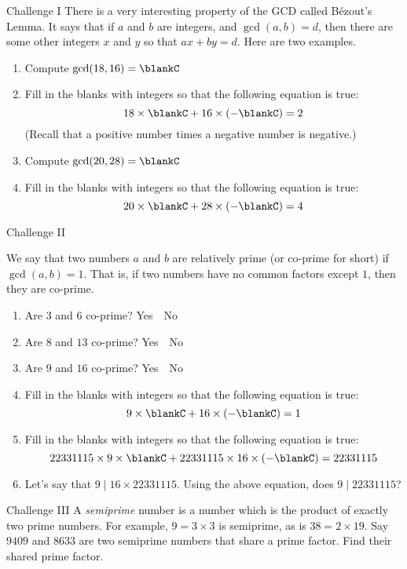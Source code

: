 \documentclass[12pt,letterpaper]{article}
\begin{document}
\begin{problem}{Challenge I}
 There is a very interesting property of the GCD called B\'ezout's Lemma. It
 says that if $a$ and $b$ are integers, and $\gcd(a, b) = d$, then there are
 some other integers $x$ and $y$ so that $ax + by = d$. Here are two examples.

 \begin{enumerate}
  \item Compute $\gcd(18, 16) = \blankC$
  \item Fill in the blanks with integers so that the following equation is true:
  \[ 18 \times \blankC + 16 \times (- \blankC) = 2 \]
  (Recall that a positive number times a negative number is negative.)
  \item Compute $\gcd(20, 28) = \blankC$
  \item Fill in the blanks with integers so that the following equation is true:
  \[ 20 \times \blankC + 28 \times (- \blankC) = 4 \]
 \end{enumerate}
\end{problem}

\begin{problem}{Challenge II}

 We say that two numbers $a$ and $b$ are relatively prime (or co-prime for
 short) if $\gcd(a, b) = 1$. That is, if two numbers have no common factors
 except $1$, then they are co-prime.

 \begin{enumerate}
  \item Are $3$ and $6$ co-prime?  \hfill Yes~~No
  \item Are $8$ and $13$ co-prime? \hfill Yes~~No
  \item Are $9$ and $16$ co-prime? \hfill Yes~~No
  \item Fill in the blanks with integers so that the following equation is true:
  \[ 9 \times \blankC + 16 \times (-\blankC) = 1 \]
  \item Fill in the blanks with integers so that the following equation is true:
  \[ 22331115 \times 9 \times \blankC + 22331115 \times 16 \times (-\blankC) =
  22331115 \]
  \item Let's say that $9 \mid 16\times22331115$. Using the above equation,
  does $9\mid22331115$?
 \end{enumerate}
\end{problem}

\begin{problem}{Challenge III}
 A \emph{semiprime} number is a number which is the product of exactly two
 prime numbers. For example, $9=3\times3$ is semiprime, as is $38=2\times19$.
 Say $9409$ and $8633$ are two semiprime numbers that share a prime factor.
 Find their shared prime factor.
\end{problem}
\end{document}
